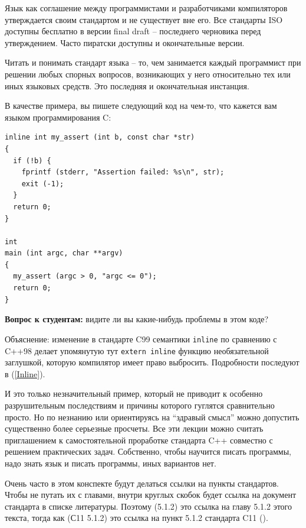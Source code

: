 \documentclass[a4paper,12pt,oneside]{article}
\newif\ifanswers
\begin{document}
Язык как соглашение между программистами и разработчиками компиляторов утверждается своим стандартом и не существует вне его. Все стандарты ISO доступны бесплатно в версии final draft – последнего черновика перед утверждением. Часто пиратски доступны и окончательные версии.

Читать и понимать стандарт языка – то, чем занимается каждый программист при решении любых спорных вопросов, возникающих у него относительно тех или иных языковых средств. Это последняя и окончательная инстанция.

В качестве примера, вы пишете следующий код на чем-то, что кажется вам языком программирования C:

\begin{lstlisting}
inline int my_assert (int b, const char *str) 
{
  if (!b) {
    fprintf (stderr, "Assertion failed: %s\n", str);
    exit (-1);
  }
  return 0;
}

int
main (int argc, char **argv)
{
  my_assert (argc > 0, "argc <= 0");
  return 0;
}
\end{lstlisting}

\textbf{Вопрос к студентам:} видите ли вы какие-нибудь проблемы в этом коде?

\ifanswers
Правильный ответ: проблемы есть. Этот код скомпилируется на GCC 4.9 и не скомпилируется на GCC 5.1 с опциями по умолчанию (проверьте, скомпилируется ли он на вашем любимом компиляторе).
\fi

Объяснение: изменение в стандарте C99 семантики \lstinline!inline! по сравнению с C++98 делает упомянутую тут \lstinline!extern inline! функцию необязательной заглушкой, которую компилятор имеет право выбросить. Подробности последуют в (\ref{Inline}).

И это только незначительный пример, который не приводит к особенно разрушительным последствиям и причины которого гуглятся сравнительно просто. Но по незнанию или ориентируясь на ``здравый смысл'' можно допустить существенно более серьезные просчеты. Все эти лекции можно считать приглашением к самостоятельной проработке стандарта C++ совместно с решением практических задач. Собственно, чтобы научится писать программы, надо знать язык и писать программы, иных вариантов нет.

Очень часто в этом конспекте будут делаться ссылки на пункты стандартов. Чтобы не путать их с главами, внутри круглых скобок будет ссылка на документ стандарта в списке литературы. Поэтому (5.1.2) это ссылка на главу 5.1.2 этого текста, тогда как (С11 5.1.2) это ссылка на пункт 5.1.2 стандарта C11 (\cite{stdc11}).
\end{document}

